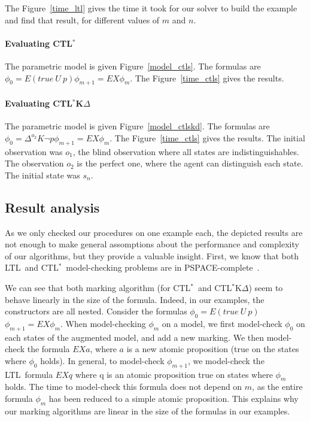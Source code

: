 \documentclass[dvipsnames]{acmart}
\def\ctls{CTL$^{*}$}
\def\ctlskd{CTL$^{*}$K$\Delta$}
\def\ltl{LTL}
\def\E{\mathit{E}}
\def\U{\mathit{U}}
\def\X{\mathit{X}}
\def\K{\mathit{K}}
\def\D#1{\Delta^{#1}}
\begin{document}
The Figure~\ref{time_ltl} gives the time it took for our solver to build the example and find that result, for different values of $m$ and $n$.

\paragraph{Evaluating \ctls}
The parametric model is given Figure~\ref{model_ctls}.
The formulas are $\phi_0 = \E(true~\U~p)$\quad$\phi_{m+1} = \E\X\phi_m$.
The Figure~\ref{time_ctls} gives the results.

\paragraph{Evaluating \ctlskd}
The parametric model is given Figure~\ref{model_ctlskd}.
The formulas are $\phi_0 = \D{o_2}\K\neg p$\quad$\phi_{m+1} =\E\X\phi_m$.
The Figure~\ref{time_ctls} gives the results.
The initial observation was $o_1$, the blind observation where all states are indistinguishables.
The observation $o_2$ is the perfect one, where the agent can distinguish each state.
The initial state was $s_n$.

\subsection{Result analysis}
As we only checked our procedures on one example each, the depicted results are not enough to make general assomptions about the performance and complexity of our algorithms, but they provide a valuable insight.
First, we know that both \ltl\ and \ctls\ model-checking problems are in PSPACE-complete~\cite{complexity}.

We can see that both marking algorithm (for \ctls\ and \ctlskd) seem to behave linearly in the size of the formula.
Indeed, in our examples, the constructors are all nested.
Consider the formulas $\phi_0 = \E(true~\U~p)$\quad$\phi_{m+1} = \E\X\phi_m$.
When model-checking $\phi_m$ on a model, we first model-check $\phi_0$ on each states of the augmented model, and add a new marking.
We then model-check the formula $\E\X a$, where $a$ is a new atomic proposition (true on the states where $\phi_0$ holds).
In general, to model-check $\phi_{m+1}$, we model-check the \ltl\ formula $\E\X q$ where q is an atomic proposition true on states where $\phi_m$ holds.
The time to model-check this formula does not depend on $m$, as the entire formula $\phi_m$ has been reduced to a simple atomic proposition.
This explains why our marking algorithms are linear in the size of the formulas in our examples.
\end{document}
